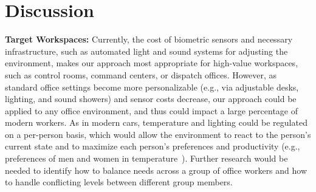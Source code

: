 \section{Discussion}

\vspace{0.05in}
\noindent
\textbf{Target Workspaces:}
Currently, the cost of biometric sensors and necessary infrastructure, such as automated light and sound systems for adjusting the environment, makes our approach most appropriate for high-value workspaces, such as control rooms, command centers, or dispatch offices. However, as standard office settings become more personalizable (e.g., via adjustable desks, lighting, and sound showers) and sensor costs decrease, our approach could be applied to any office environment, and thus could impact a large percentage of modern workers. As in modern cars, temperature and lighting could be regulated on a per-person basis, which would allow the environment to react to the person's current state and to maximize each person's preferences and productivity (e.g., preferences of men and women in temperature~\cite{Karjalainen07}). Further research would be needed to identify how to balance needs across a group of office workers and how to handle conflicting levels between different group members.

